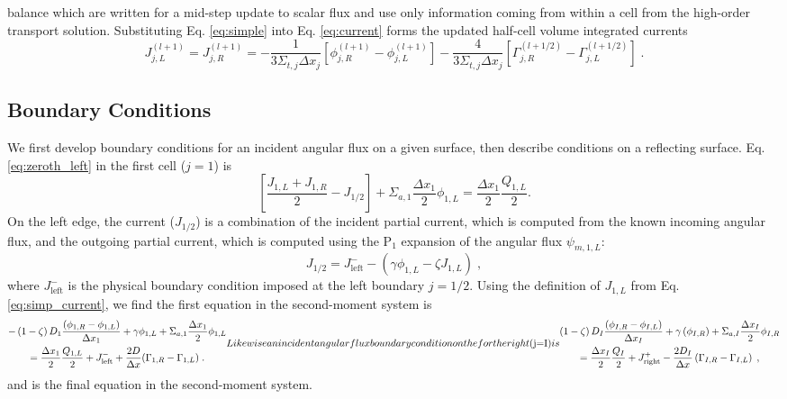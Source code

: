 balance which are written for a mid-step update to scalar flux and use only information coming from within a cell from the high-order transport solution.
Substituting Eq. \eqref{eq:simple} into Eq. \eqref{eq:current} forms the updated half-cell volume integrated currents 
\begin{equation}
\label{eq:simp_current}
    J_{j,L}^{(l+1)} = J_{j,R}^{(l+1)} = - \frac{1}{3 \Sigma_{t,j} \Delta x_j} \left[ \phi_{j,R}^{(l+1)} - \phi_{j,L}^{(l+1)} \right] - \frac{4}{3 \Sigma_{t,j} \Delta x_j} \left[ \Gamma_{j,R}^{(l+1/2)} - \Gamma_{j,L}^{(l+1/2)}  \right] \;.
\end{equation}


\subsection{Boundary Conditions}

We first develop boundary conditions for an incident angular flux on a given surface, then describe conditions on a reflecting surface.
Eq. \eqref{eq:zeroth_left} in the first cell ($j=1$) is
\begin{equation}
 \left[ \frac{J_{1,L} + J_{1,R}}{2} - J_{1/2} \right] + \Sigma_{a,1} \frac{\Delta x_1}{2} \phi_{1,L} = \frac{\Delta x_1}{2} \frac{Q_{1,L}}{2}. 
\end{equation}
On the left edge, the current ($J_{1/2}$) is a combination of the incident partial current, which is computed from the known incoming angular flux, and the outgoing partial current, which is computed using the P$_1$ expansion of the angular flux $\psi_{m,1,L}$:
\begin{equation}
    J_{1/2}= J^{-}_{\text{left}} - \left(\gamma \phi_{1,L} - \zeta J_{1,L}\right) \; ,
\end{equation}
where $J^{-}_{\text{left}}$ is the physical boundary condition imposed at the left boundary $j=1/2$.
Using the definition of $J_{1,L}$ from Eq. \eqref{eq:simp_current}, we find the first equation in the second-moment system is
\begin{subequations}
\label{eq:bc_inc}
\begin{multline}
    -\left(1-\zeta \right) D_1 \frac{\left( \phi_{1,R} - \phi_{1,L} \right)}{\Delta x_1} +\gamma  \phi_{1,L}  + \Sigma_{a,1} \frac{\Delta x_1}{2} \phi_{1,L} 
    \\ = 
    \frac{\Delta x_1}{2} \frac{Q_{1,L}}{2} +J^{-}_{\text{left}}+ 
    \frac{2D}{\Delta x}(\Gamma_{1,R}-\Gamma_{1,L}) \; .
\end{multline}
Likewise an incident angular flux boundary condition on the for the right ($j=I$) is
\begin{multline}
    \left(1-\zeta \right) D_I \frac{\left( \phi_{I,R} - \phi_{I,L} \right)}{\Delta x_I} +\gamma \left( \phi_{I,R}   \right)
    + \Sigma_{a,I} \frac{\Delta x_I}{2} \phi_{I,R}\\ = 
    \frac{\Delta x_I}{2}\frac{Q_I}{2} + J_{\text{right}}^+ - \frac{2 D_I}{\Delta x} \left( \Gamma_{I,R} - \Gamma_{I,L}\right) \; ,
\end{multline}
\end{subequations}
and is the final equation in the second-moment system.

